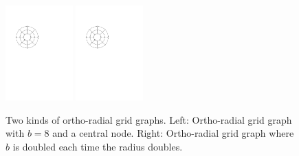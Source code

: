 \documentclass[sigconf]{acmart}
\begin{document}
\begin{figure}
    \centering
	\includegraphics[width=0.23\textwidth]{figures2/ortho.pdf}
	\hfill
	\includegraphics[width=0.23\textwidth,page=2]{figures2/ortho.pdf}
	\caption{Two kinds of ortho-radial grid graphs. Left: Ortho-radial grid graph with $b = 8$ and a central node. Right: Ortho-radial grid graph where $b$ is doubled each time the radius doubles.}
	\label{FIG:orthoradgrid}
	\vspace{-.65cm}
\end{figure}



\end{document}
